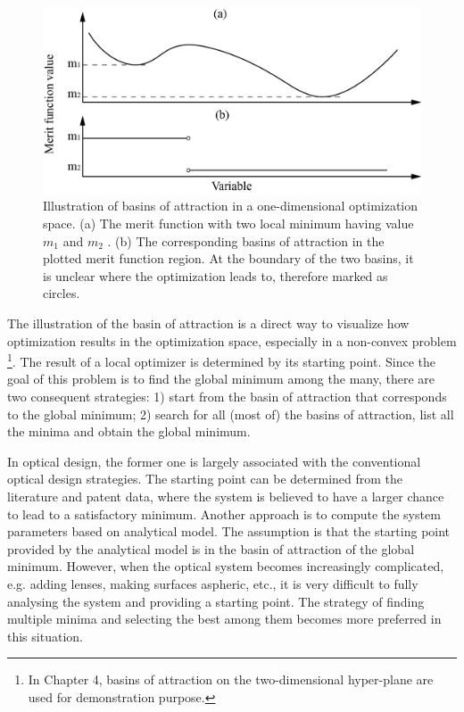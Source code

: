 \begin{figure}
    \centering
    \includegraphics[scale=0.58]{chapter-1/figures/basinOfattraction.png}
    \caption{Illustration of basins of attraction in a one-dimensional optimization space. (a) The merit function with two local minimum having value $m_1$ and $m_2$ . (b) The corresponding basins of attraction in the plotted merit function region. At the boundary of the two basins, it is unclear where the optimization leads to, therefore marked as circles.}
    \label{fig: basinOfattraction}
\end{figure} 

The illustration of the basin of attraction is a direct way to visualize how optimization results in the optimization space, especially in a non-convex problem \footnote{In Chapter 4, basins of attraction on the two-dimensional hyper-plane are used for demonstration purpose. }. The result of a local optimizer is determined by its starting point. Since the goal of this problem is to find the global minimum among the many, there are two consequent strategies: 
1) start from the basin of attraction that corresponds to the global minimum; 
2) search for all (most of) the basins of attraction, list all the minima and obtain the global minimum.

In optical design, the former one is largely associated with the conventional optical design strategies. The starting point can be determined from the literature and patent data, where the system is believed to have a larger chance to lead to a satisfactory minimum. Another approach is to compute the system parameters based on analytical model. The assumption is that the starting point provided by the analytical model is in the basin of attraction of the global minimum.  However, when the optical system becomes increasingly complicated, e.g. adding lenses, making surfaces aspheric, etc., it is very difficult to fully analysing the system and providing a starting point. The strategy of finding multiple minima and selecting the best among them becomes more preferred in this situation. 

